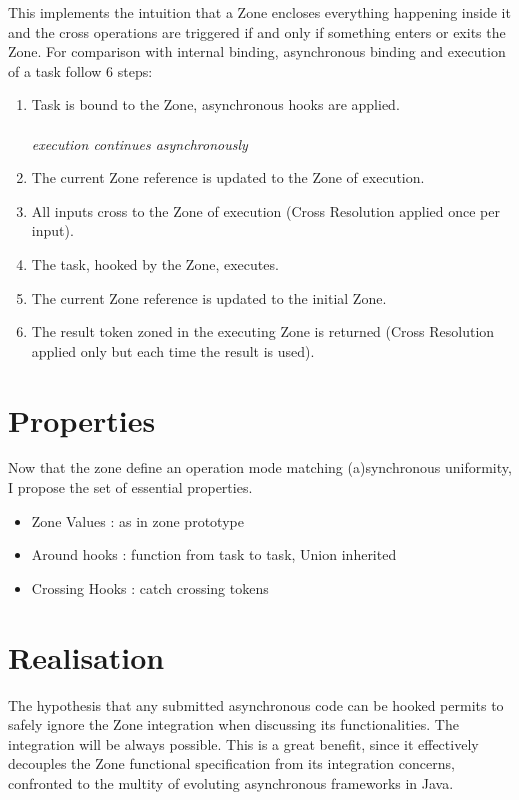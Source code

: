 This implements the intuition that a Zone encloses everything happening inside it and the cross operations are triggered if and only if something enters or exits the Zone.
For comparison with internal binding, asynchronous binding and execution of a task follow 6 steps:

\begin{enumerate}
\item Task is bound to the Zone, asynchronous hooks are applied. \\ \\
\textit{execution continues asynchronously} \\
\item The current Zone reference is updated to the Zone of execution.
\item All inputs cross to the Zone of execution (Cross Resolution applied once per input).
\item The task, hooked by the Zone, executes.
\item The current Zone reference is updated to the initial Zone.
\item The result token zoned in the executing Zone is returned (Cross Resolution applied only but each time the result is used).

\end{enumerate}

\section{Properties} %

Now that the zone define an operation mode matching (a)synchronous uniformity, I propose the set of essential properties.

\begin{itemize}
\item Zone Values : as in zone prototype
\item Around hooks : function from task to task, Union inherited
\item Crossing Hooks : catch crossing tokens
\end{itemize}

\section{Realisation}

The hypothesis that any submitted asynchronous code can be hooked permits to safely ignore the Zone integration when discussing its functionalities. The integration will be always possible. This is a great benefit, since it effectively decouples the Zone functional specification from its integration concerns, confronted to the multity of evoluting asynchronous frameworks in Java.

